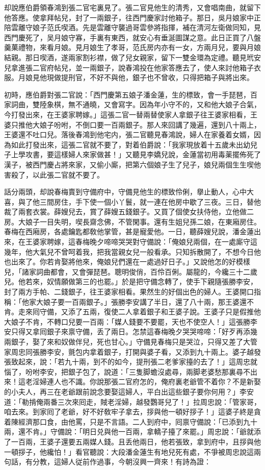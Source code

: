 却說應伯爵領春鴻到張二官宅裏見了。張二官見他生的清秀，又會唱南曲，就留下他答應。使拿拜帖兒，封了一兩銀子，往西門慶家討他箱子。那日，吳月娘家中正陪雲離守娘子范氏喫酒。先是雲離守襲過哥雲參將指揮，補在清河左衛做同知，見西門慶死了，吴月娘守寡，手裏有東西，就安心有垂涎圖謀之意。此日正買了八盤羹菓禮物，來看月娘。見月娘生了孝哥，范氏房内亦有一女，方兩月兒，要與月娘結親。那日喫酒，遂兩家割衫襟，做了兒女親家，留下一雙金環為定禮。聽見玳安兒拿進張二官府帖兒，並一兩銀子，說春鴻投在他家答應去了，使人來討他箱子衣服。月娘見他現做提刑官，不好不與他，銀子也不曾收，只得把箱子與將出來。

初時，應伯爵對張二官說：「西門慶第五娘子潘金蓮，生的標致，會一手琵琶，百家詞曲，雙陸象棋，無不通曉，又會寫字。因為年小守不的，又和他大娘子合氣，今打發出來，在王婆家聘嫁。」這張二官一替兩替使家人拿銀子往王婆家相看，王婆只推他大娘子吩咐，不倒口要一百兩銀子。那人來回講了幾遍，還到八十兩上，王婆還不吐口兒。落後春鴻到他宅内，張二官聽見春鴻說，婦人在家養着女婿，因為如此打發出來，這張二官就不要了，對着伯爵說：「我家現放着十五歲未出幼兒子上學攻書，要這樣婦人來家做甚！」又聽見李嬌兒說，金蓮當初用毒薬擺佈死了漢子，被西門慶占將來家，又偷小廝，把第六個娘子生了兒子，娘兒兩個生生喫他害殺了，以此張二官就不要了。

話分兩頭，却說春梅賣到守備府中，守備見他生的標致伶俐，擧止動人，心中大喜，與了他三間房住，手下使一個小丫鬟，就一連在他房中歇了三夜。三日，替他裁了兩套衣裳。薛嫂兒去，賞了薛嫂五錢銀子。又買了個使女扶侍他，立他做二房。大娘子一目失明，喫長齋念佛，不管閑事。還有生姐兒孫二娘，在東廂房住。春梅在西廂房，各處鑰匙都敎他掌管，甚是寵愛他。一日，聽薛嫂兒說，潘金蓮出來，在王婆家聘嫁，這春梅晚夕啼啼哭哭對守備說：「俺娘兒兩個，在一處廝守這幾年，他大氣兒不曾呵着我，把我當親女兒一般看承。只知拆散開了，不想今日他也出來了。你若肯娶將他來，俺娘兒們還在一處過好日子。」又說他怎的好模樣兒，「諸家詞曲都會，又會彈琵琶。聰明俊俏，百伶百俐。屬龍的，今纔三十二歲兒。他若來，奴情願做第三的也罷。」於是把守備念轉了，使手下親隨張勝李安，封了兩方手帕、二錢銀子，往王婆家相看。果然生的好個出色的婦人。王婆開口指稱：「他家大娘子要一百兩銀子。」張勝李安講了半日，還了八十兩，那王婆還不肯。走來囘守備，又添了五兩，復使二人拿着銀子和王婆子說。王婆子只是假推他大娘子不肯，不轉口兒要一百兩：「媒人錢要不要罷，天也不使空人！」這張勝李安只得又拿囘銀子來禀守備，丢了兩日。怎禁這春梅晚夕哭哭啼啼：「好歹再添幾兩銀子，娶了來和奴做伴兒，死也甘心。」守備見春梅只是哭泣，只得又差了大管家周忠同張勝李安，氈包内拿着銀子，打開與婆子看，又添到九十兩上。婆子越發張致起來，說：「若九十兩，到不的如今，提刑張二老爹家擡的去了！」這周忠就惱了，吩咐李安，把銀子包了，說道：「三隻脚蟾沒處尋，兩脚老婆愁那裏尋不出來！這老淫婦連人也不識。你說那張二官府怎的，俺府裏老爺管不着你？不是新娶的小夫人，再三在老爺跟前說念要娶這婦人，平白出這些銀子要你何用？」李安道：「勒掯俺兩番三次來囘走，賊老淫婦，越發鸚哥兒了！」拉周忠說：「管家哥，咱去來。到家囘了老爺，好不好敎牢子拿去，拶與他一頓好拶子！」這婆子終是貪着陳經濟那口食，由他罵，只是不言語。二人到府中，囘禀守備說：「已添到九十兩，還不肯。」守備說：「明日兑與他一百兩，拿轎子擡了來罷。」周忠說：「爺就添了一百兩，王婆子還要五兩媒人錢。且丢他兩日，他若張致，拿到府中，且拶與他一頓拶子，他纔怕！」看官聽說：大段潘金蓮生有地兒死有處，不爭被周忠說這兩句話，有分教，這婦人従前作過事，今朝沒興一齊來！有詩為證：

